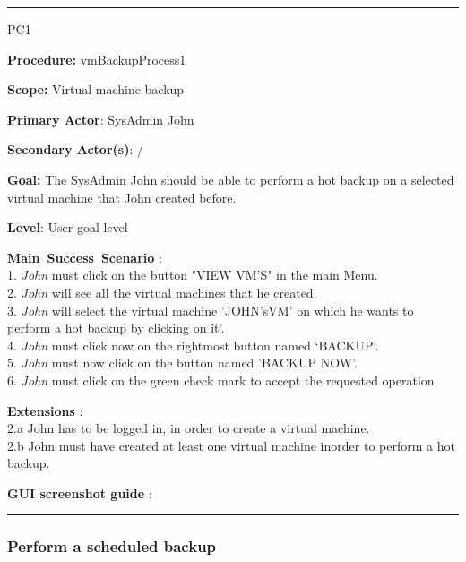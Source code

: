 \hrule
\vspace{0.5cm}
\begin{lyxlist}{PC1}
\small{
\item [\textbf{Procedure:}] vmBackupProcess1
\item [\textbf{Scope:}] Virtual machine backup
\item [\textbf{Primary Actor}:] SysAdmin John 
\item [\textbf{Secondary Actor(s)}:] /
\item [\textbf{Goal:}] The SysAdmin John should be able to perform a hot backup
on a selected virtual machine that John created before.
\item [\textbf{Level}:] User-goal level
\item [\textbf{Main~Success~Scenario}]:\\
1. \emph{John} must click on the button "VIEW VM'S" in the main Menu.\\
2. \emph{John} will see all the virtual machines that he created.\\
3. \emph{John} will select the virtual machine 'JOHN'sVM' on which he wants
to perform a hot backup by clicking on it'.\\
4. \emph{John} must click now on the rightmost button named `BACKUP`.\\
5. \emph{John} must now click on the button named 'BACKUP NOW'.\\
6. \emph{John} must click on the green check mark to accept the requested
operation.\\



\item [\textbf{Extensions}]:\\
2.a John has to be logged in, in order to create a virtual machine.\\
2.b John must have created at least one virtual machine inorder to perform a
hot backup.\\

\item [\textbf{GUI screenshot guide}]:\\
}
\end{lyxlist}
\hrule
\vspace{0.5cm}










\subsubsection{Perform a scheduled backup}

